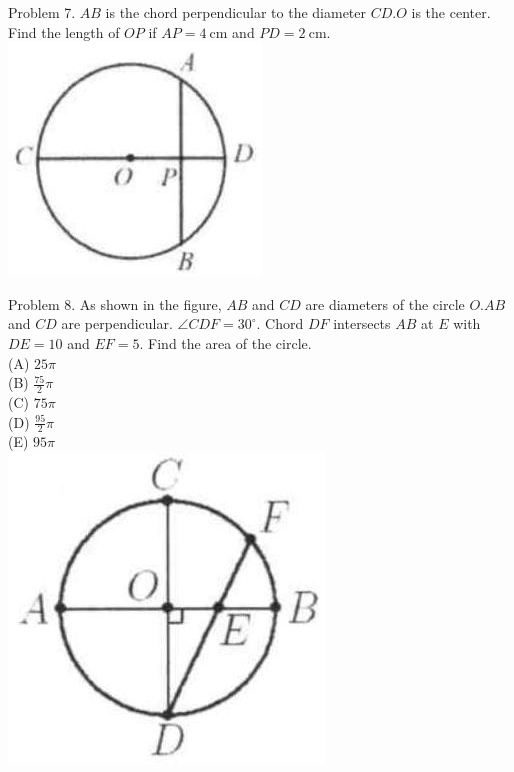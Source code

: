 \documentclass[10pt]{article}
\begin{document}
Problem 7. \(A B\) is the chord perpendicular to the diameter \(C D . O\) is the center. Find the length of \(O P\) if \(A P=4 \mathrm{~cm}\) and \(P D=2 \mathrm{~cm}\).\\
\includegraphics[max width=\textwidth, center]{2025_04_17_97bc1f7e44d93c271a88g-170(3)}

Problem 8. As shown in the figure, \(A B\) and \(C D\) are diameters of the circle \(O . A B\) and \(C D\) are perpendicular. \(\angle C D F=30^{\circ}\). Chord \(D F\) intersects \(A B\) at \(E\) with \(D E=10\) and \(E F=5\). Find the area of the circle.\\
(A) \(25 \pi\)\\
(B) \(\frac{75}{2} \pi\)\\
(C) \(75 \pi\)\\
(D) \(\frac{95}{2} \pi\)\\
(E) \(95 \pi\)\\
\includegraphics[max width=\textwidth, center]{2025_04_17_97bc1f7e44d93c271a88g-170(1)}
\end{document}
